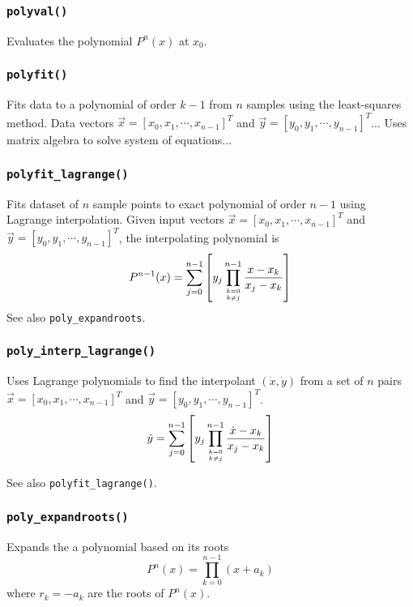 \subsubsection{{\tt polyval()}}
Evaluates the polynomial $P^n(x)$ at $x_0$.

\subsubsection{{\tt polyfit()}}
Fits data to a polynomial of order $k-1$ from $n$ samples using the
least-squares method.
Data vectors
$\vec{x}=[x_0,x_1,\cdots,x_{n-1}]^T$ and 
$\vec{y}=[y_0,y_1,\cdots,y_{n-1}]^T$...
Uses matrix algebra to solve system of equations...

\subsubsection{{\tt polyfit\_lagrange()}}
Fits dataset of $n$ sample points to exact polynomial of order $n-1$ using
Lagrange interpolation.
Given input vectors
$\vec{x}=[x_0,x_1,\cdots,x_{n-1}]^T$ and 
$\vec{y}=[y_0,y_1,\cdots,y_{n-1}]^T$, the interpolating polynomial is
\[
    P^{n-1}(x) =
        \sum_{j=0}^{n-1}
        {
            \left[
            y_j
            \prod_{{k=0}\atop{k \ne j}}^{n-1}
            {
                \frac{x-x_k}{x_j-x_k}
            }
            \right]
        }
\]
See also {\tt poly\_expandroots}.

\subsubsection{{\tt poly\_interp\_lagrange()}}
Uses Lagrange polynomials to find the interpolant
$(\dot{x},\dot{y})$ from a set of $n$ pairs
$\vec{x}=[x_0,x_1,\cdots,x_{n-1}]^T$ and 
$\vec{y}=[y_0,y_1,\cdots,y_{n-1}]^T$.
\[
    \dot{y} =
        \sum_{j=0}^{n-1}
        {
            \left[
            y_j
            \prod_{{k=0}\atop{k \ne j}}^{n-1}
            {
                \frac{\dot{x}-x_k}{x_j-x_k}
            }
            \right]
        }
\]

See also {\tt polyfit\_lagrange()}.

\subsubsection{{\tt poly\_expandroots()}}
Expands the a polynomial based on its roots
\[
    P^n(x) = \prod_{k=0}^{n-1}{(x+a_k)}
\]
where $r_k=-a_k$ are the roots of $P^n(x)$.


